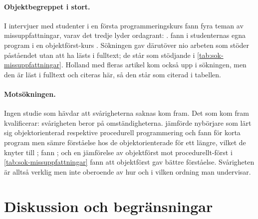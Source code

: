 \paragraph{Objektbegreppet i stort.}  I intervjuer med studenter i en
första programmeringskurs fann \textcite{Kaczmarczyk2010} fyra teman av
missuppfattningar, varav det tredje lyder ordagrant:
.  \Textcite{SandersThomas2007} fann i studenternas
egna program i en objektförst-kurs .  Sökningen gav därutöver nio arbeten som
stöder påståendet utan att ha lästs i fulltext; de står som stödjande i
\cref{tab:sok-missuppfattningar}.  Holland med fleras artikel kom också
upp i sökningen, men den är läst i fulltext och citeras här, så den står
som citerad i tabellen.

\paragraph{Motsökningen.}  Ingen studie som hävdar att svårigheterna
saknas kom fram.  Det som kom fram kvalificerar: svårigheten beror på
omständigheterna.  \Textcite{Wiedenbeck1999} jämförde nybörjare som lärt
sig objektorienterad respektive procedurell programmering och fann
 för korta program
men sämre förståelse hos de objektorienterade för ett längre, vilket de
knyter till ;
\textcite{KunkleAllen2016} fann ; och en jämförelse av objektförst mot procedurellt-först i
\cref{tab:sok-missuppfattningar} fann att objektförst gav bättre
förståelse.  Svårigheten är alltså verklig men inte oberoende av hur
och i vilken ordning man undervisar.

\section{Diskussion och begränsningar}
\label{sec:miss-diskussion-klasser}

